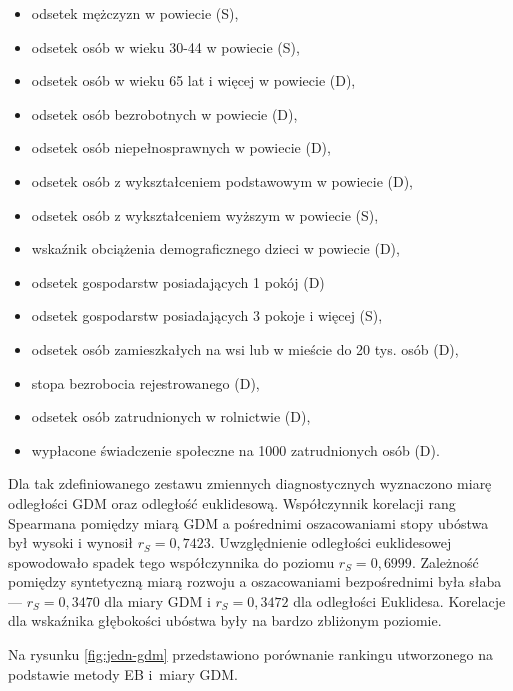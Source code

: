\begin{itemize}
\item odsetek mężczyzn w powiecie (S),
\item odsetek osób w wieku 30-44 w powiecie (S),
\item odsetek osób w wieku 65 lat i więcej w powiecie (D),
\item odsetek osób bezrobotnych w powiecie (D),
\item odsetek osób niepełnosprawnych w powiecie (D),
\item odsetek osób z wykształceniem podstawowym w powiecie (D),
\item odsetek osób z wykształceniem wyższym w powiecie (S),
\item wskaźnik obciążenia demograficznego dzieci w powiecie (D),
\item odsetek gospodarstw posiadających 1 pokój (D)
\item odsetek gospodarstw posiadających 3 pokoje i więcej (S),
\item odsetek osób zamieszkałych na wsi lub w mieście do 20 tys. osób (D),
\item stopa bezrobocia rejestrowanego (D),
\item odsetek osób zatrudnionych w rolnictwie (D),
\item wypłacone świadczenie społeczne na 1000 zatrudnionych osób (D).
\end{itemize}

Dla tak zdefiniowanego zestawu zmiennych diagnostycznych wyznaczono miarę odległości GDM oraz odległość euklidesową. Współczynnik korelacji rang Spearmana pomiędzy miarą GDM a pośrednimi oszacowaniami stopy ubóstwa był wysoki i wynosił $r_S=0,7423$. Uwzględnienie odległości euklidesowej spowodowało spadek tego współczynnika do poziomu $r_S=0,6999$. Zależność pomiędzy syntetyczną miarą rozwoju a oszacowaniami bezpośrednimi była słaba --- $r_S=0,3470$ dla miary GDM i $r_S=0,3472$ dla odległości Euklidesa. Korelacje dla wskaźnika głębokości ubóstwa były na bardzo zbliżonym poziomie.

Na rysunku \ref{fig:jedn-gdm} przedstawiono porównanie rankingu utworzonego na podstawie metody EB i~miary GDM.

